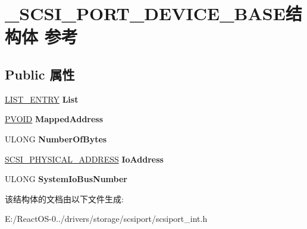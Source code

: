 \hypertarget{struct___s_c_s_i___p_o_r_t___d_e_v_i_c_e___b_a_s_e}{}\section{\+\_\+\+S\+C\+S\+I\+\_\+\+P\+O\+R\+T\+\_\+\+D\+E\+V\+I\+C\+E\+\_\+\+B\+A\+S\+E结构体 参考}
\label{struct___s_c_s_i___p_o_r_t___d_e_v_i_c_e___b_a_s_e}
\subsection*{Public 属性}
\begin{DoxyCompactItemize}
\item 
\mbox{\label{struct___s_c_s_i___p_o_r_t___d_e_v_i_c_e___b_a_s_e_a9bab047d724894ca0fbb8ce2514454d6}} 
\hyperlink{struct___l_i_s_t___e_n_t_r_y}{L\+I\+S\+T\+\_\+\+E\+N\+T\+RY} {\bfseries List}
\item 
\mbox{\label{struct___s_c_s_i___p_o_r_t___d_e_v_i_c_e___b_a_s_e_ab7481905595435d473b1bac0a0cd6a99}} 
\hyperlink{interfacevoid}{P\+V\+O\+ID} {\bfseries Mapped\+Address}
\item 
\mbox{\label{struct___s_c_s_i___p_o_r_t___d_e_v_i_c_e___b_a_s_e_a9799a3381e752fc16d4efe5aa1a4e912}} 
U\+L\+O\+NG {\bfseries Number\+Of\+Bytes}
\item 
\mbox{\label{struct___s_c_s_i___p_o_r_t___d_e_v_i_c_e___b_a_s_e_acf143c776b527240fda45535d70af03b}} 
\hyperlink{union___l_a_r_g_e___i_n_t_e_g_e_r}{S\+C\+S\+I\+\_\+\+P\+H\+Y\+S\+I\+C\+A\+L\+\_\+\+A\+D\+D\+R\+E\+SS} {\bfseries Io\+Address}
\item 
\mbox{\label{struct___s_c_s_i___p_o_r_t___d_e_v_i_c_e___b_a_s_e_a1b11d6c9cdc04f128c361d73a4b9f671}} 
U\+L\+O\+NG {\bfseries System\+Io\+Bus\+Number}
\end{DoxyCompactItemize}


该结构体的文档由以下文件生成\+:\begin{DoxyCompactItemize}
\item 
E\+:/\+React\+O\+S-\/0../drivers/storage/scsiport/scsiport\+\_\+int.\+h\end{DoxyCompactItemize}
